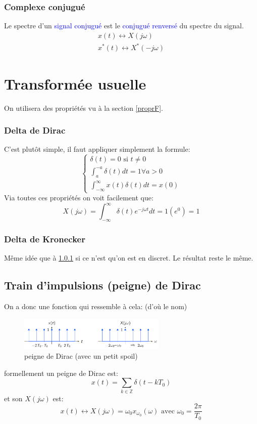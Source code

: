 \documentclass{report}
\begin{document}
\subsubsection{Complexe conjugué}
Le spectre d'un \textcolor{blue}{signal conjugué} est le \textcolor{blue}{conjugué renversé} du spectre du signal.
\begin{align*}
x(t) \longleftrightarrow X(j\omega)\\
x^*(t) \longleftrightarrow X^*(-j\omega)
\end{align*}


\section{Transformée usuelle}
On utilisera des propriétés vu à la section \ref{proprF}.

\subsubsection{Delta de Dirac} \label{Dirac}
C'est plutôt simple, il faut appliquer simplement la formule:
\begin{equation}
\begin{cases}
\delta(t) = 0 \text{ si } t \neq 0\\
\int_a^{-a} \delta(t) dt = 1 \forall a > 0\\
\int_{-\infty}^{\infty} x(t) \delta(t) dt = x(0)
\end{cases}
\end{equation}
Via toutes ces propriétés on voit facilement que:
\begin{equation}
X(j\omega) = \int_{-\infty}^{\infty} \delta(t) e^{-j \omega t} dt = 1(e^0) = 1
\end{equation}

\subsubsection{Delta de Kronecker}
Même idée que à \ref{Dirac} si ce n'est qu'on est en discret. Le résultat reste le même.

\subsection{Train d'impulsions (peigne) de Dirac}
On a donc une fonction qui ressemble à cela: (d'où le nom)
\begin{figure}[H]
\centering
\includegraphics[width=7cm]{img/peigne.png}
\caption{peigne de Dirac (avec un petit spoil)}
\end{figure}
formellement un peigne de Dirac est:
\begin{equation}
x(t) = \sum_{k \in \mathbb{Z}} \delta(t-kT_0)
\end{equation}
et son $X(j\omega)$ est:
\begin{equation}
x(t) \longleftrightarrow X(j\omega) = \omega_0 x_{\omega_0} (\omega) \text{ avec } \omega_0 = \frac{2\pi}{T_0}
\end{equation}
\end{document}

